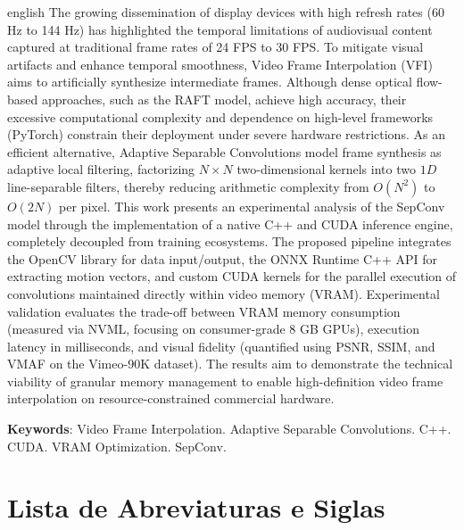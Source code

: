 \documentclass[
    12pt,                %
    openright,           %
    oneside,             %
    a4paper,             %
    english,             %
    brazil               %
]{abntex2}
\begin{document}
\begin{resumo}[Abstract]
 \begin{otherlanguage*}{english}
The growing dissemination of display devices with high refresh rates (60 Hz to 144 Hz) has highlighted the temporal limitations of audiovisual content captured at traditional frame rates of 24 FPS to 30 FPS. To mitigate visual artifacts and enhance temporal smoothness, Video Frame Interpolation (VFI) aims to artificially synthesize intermediate frames. Although dense optical flow-based approaches, such as the RAFT model, achieve high accuracy, their excessive computational complexity and dependence on high-level frameworks (PyTorch) constrain their deployment under severe hardware restrictions. As an efficient alternative, Adaptive Separable Convolutions model frame synthesis as adaptive local filtering, factorizing $N \times N$ two-dimensional kernels into two $1D$ line-separable filters, thereby reducing arithmetic complexity from $O(N^2)$ to $O(2N)$ per pixel. This work presents an experimental analysis of the SepConv model through the implementation of a native C++ and CUDA inference engine, completely decoupled from training ecosystems. The proposed pipeline integrates the OpenCV library for data input/output, the ONNX Runtime C++ API for extracting motion vectors, and custom CUDA kernels for the parallel execution of convolutions maintained directly within video memory (VRAM). Experimental validation evaluates the trade-off between VRAM memory consumption (measured via NVML, focusing on consumer-grade 8 GB GPUs), execution latency in milliseconds, and visual fidelity (quantified using PSNR, SSIM, and VMAF on the Vimeo-90K dataset). The results aim to demonstrate the technical viability of granular memory management to enable high-definition video frame interpolation on resource-constrained commercial hardware.

   \vspace{\onelineskip}

   \noindent
   \textbf{Keywords}: Video Frame Interpolation. Adaptive Separable Convolutions. C++. CUDA. VRAM Optimization. SepConv.
 \end{otherlanguage*}
\end{resumo}

\chapter*{Lista de Abreviaturas e Siglas}
\end{document}
